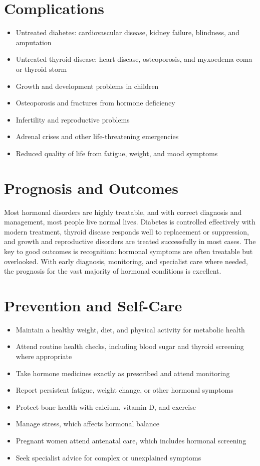 \section*{Complications}
\begin{itemize}
    \item Untreated diabetes: cardiovascular disease, kidney failure, blindness, and amputation
    \item Untreated thyroid disease: heart disease, osteoporosis, and myxoedema coma or thyroid storm
    \item Growth and development problems in children
    \item Osteoporosis and fractures from hormone deficiency
    \item Infertility and reproductive problems
    \item Adrenal crises and other life-threatening emergencies
    \item Reduced quality of life from fatigue, weight, and mood symptoms
\end{itemize}

\section*{Prognosis and Outcomes}
Most hormonal disorders are highly treatable, and with correct diagnosis and management, most people live normal lives. Diabetes is controlled effectively with modern treatment, thyroid disease responds well to replacement or suppression, and growth and reproductive disorders are treated successfully in most cases. The key to good outcomes is recognition: hormonal symptoms are often treatable but overlooked. With early diagnosis, monitoring, and specialist care where needed, the prognosis for the vast majority of hormonal conditions is excellent.

\section*{Prevention and Self-Care}
\begin{itemize}
    \item Maintain a healthy weight, diet, and physical activity for metabolic health
    \item Attend routine health checks, including blood sugar and thyroid screening where appropriate
    \item Take hormone medicines exactly as prescribed and attend monitoring
    \item Report persistent fatigue, weight change, or other hormonal symptoms
    \item Protect bone health with calcium, vitamin D, and exercise
    \item Manage stress, which affects hormonal balance
    \item Pregnant women attend antenatal care, which includes hormonal screening
    \item Seek specialist advice for complex or unexplained symptoms
\end{itemize}

